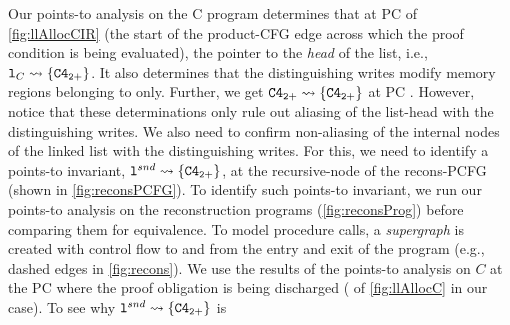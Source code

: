 \vspace{-5px}
Our points-to analysis on
the C program determines that at PC  of \cref{fig:llAllocCIR} (the start of
the product-CFG edge  across which the proof
condition is being evaluated), the pointer to the {\em head}
of the list, i.e., ${\tt l}_{C} \rightsquigarrow{} \{ {\tt C4_{2+}} \}$.
It also determines that the distinguishing
writes modify memory regions belonging to  only.
Further, we get ${\tt C4_{2+}} \rightsquigarrow{} \{ {\tt C4_{2+}} \}$ at PC .
However, notice that these determinations only rule out aliasing of the list-head with
the distinguishing writes. We also need to confirm non-aliasing
of the internal nodes of the linked list with the distinguishing writes.
For this, we need to identify a points-to invariant,
${\tt l}^{snd} \rightsquigarrow{} \{ {\tt C4_{2+}} \}$, at the recursive-node
of the recons-PCFG (shown in \cref{fig:reconsPCFG}).
To identify such points-to invariant, we run our points-to analysis
on the reconstruction programs (\cref{fig:reconsProg}) before comparing them for equivalence.
To model procedure calls, a {\em supergraph} is created with control flow to and from the entry and exit
of the program (e.g., dashed edges in \cref{fig:recons}).
We use the results of the points-to analysis on $C$ at the PC where the proof obligation
is being discharged ( of \cref{fig:llAllocC} in our case).
To see why ${\tt l}^{snd} \rightsquigarrow{} \{ {\tt C4_{2+}} \}$ is
